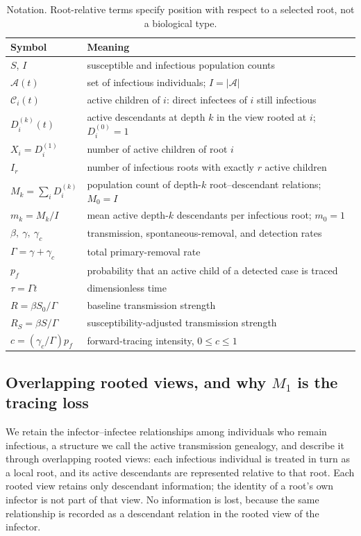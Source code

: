 \documentclass[review,12pt]{elsarticle}
\numberwithin{equation}{section}
\theoremstyle{remark}
\begin{document}
\begin{table}[htbp]
\centering
\caption{Notation. Root-relative terms specify position with respect to a selected root, not a biological type.}\label{tab:notation}
\begin{tabular}{@{}ll@{}}
\toprule
Symbol & Meaning \\
\midrule
$S$, $I$ & susceptible and infectious population counts \\
$\mathcal A(t)$ & set of infectious individuals; $I=|\mathcal A|$ \\
$\mathcal C_i(t)$ & active children of $i$: direct infectees of $i$ still infectious \\
$D_i^{(k)}(t)$ & active descendants at depth $k$ in the view rooted at $i$; $D_i^{(0)}=1$ \\
$X_i=D_i^{(1)}$ & number of active children of root $i$ \\
$I_r$ & number of infectious roots with exactly $r$ active children \\
$M_k=\sum_i D_i^{(k)}$ & population count of depth-$k$ root--descendant relations; $M_0=I$ \\
$m_k=M_k/I$ & mean active depth-$k$ descendants per infectious root; $m_0=1$ \\
$\beta,\ \gamma,\ \gamma_c$ & transmission, spontaneous-removal, and detection rates \\
$\Gamma=\gamma+\gamma_c$ & total primary-removal rate \\
$p_f$ & probability that an active child of a detected case is traced \\
$\tau=\Gamma t$ & dimensionless time \\
$R=\beta S_0/\Gamma$ & baseline transmission strength \\
$R_S=\beta S/\Gamma$ & susceptibility-adjusted transmission strength \\
$c=(\gamma_c/\Gamma)p_f$ & forward-tracing intensity, $0\leq c\leq1$ \\
\bottomrule
\end{tabular}
\end{table}

\subsection{Overlapping rooted views, and why $M_1$ is the tracing loss}\label{subsec2.2}

We retain the infector--infectee relationships among individuals who remain infectious, a structure we call the active transmission genealogy, and describe it through overlapping rooted views: each infectious individual is treated in turn as a local root, and its active descendants are represented relative to that root. Each rooted view retains only descendant information; the identity of a root's own infector is not part of that view. No information is lost, because the same relationship is recorded as a descendant relation in the rooted view of the infector.
\end{document}
